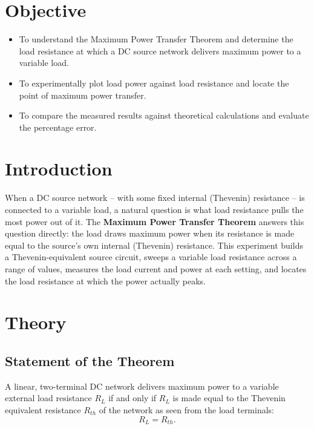 \section{Objective}
\begin{itemize}
    \item To understand the Maximum Power Transfer Theorem and determine the load resistance at which a DC source network delivers maximum power to a variable load.
    \item To experimentally plot load power against load resistance and locate the point of maximum power transfer.
    \item To compare the measured results against theoretical calculations and evaluate the percentage error.
\end{itemize}

\section{Introduction}
When a DC source network -- with some fixed internal (Thevenin) resistance -- is connected to a variable load, a natural question is what load resistance pulls the most power out of it. The \textbf{Maximum Power Transfer Theorem} answers this question directly: the load draws maximum power when its resistance is made equal to the source's own internal (Thevenin) resistance. This experiment builds a Thevenin-equivalent source circuit, sweeps a variable load resistance across a range of values, measures the load current and power at each setting, and locates the load resistance at which the power actually peaks.

\section{Theory}

\subsection{Statement of the Theorem}
A linear, two-terminal DC network delivers maximum power to a variable external load resistance $R_L$ if and only if $R_L$ is made equal to the Thevenin equivalent resistance $R_{th}$ of the network as seen from the load terminals:
\[
R_L = R_{th}.
\]

